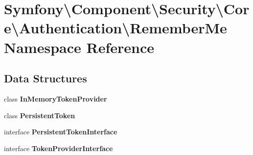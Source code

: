 \section{Symfony\textbackslash{}Component\textbackslash{}Security\textbackslash{}Core\textbackslash{}Authentication\textbackslash{}Remember\+Me Namespace Reference}
\label{namespace_symfony_1_1_component_1_1_security_1_1_core_1_1_authentication_1_1_remember_me}
\subsection*{Data Structures}
\begin{DoxyCompactItemize}
\item 
class {\bf In\+Memory\+Token\+Provider}
\item 
class {\bf Persistent\+Token}
\item 
interface {\bf Persistent\+Token\+Interface}
\item 
interface {\bf Token\+Provider\+Interface}
\end{DoxyCompactItemize}
